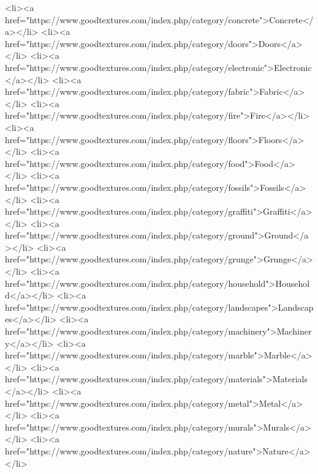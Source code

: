                                                     <li><a href="https://www.goodtextures.com/index.php/category/concrete">Concrete</a></li>
                                                    <li><a href="https://www.goodtextures.com/index.php/category/doors">Doors</a></li>
                                                    <li><a href="https://www.goodtextures.com/index.php/category/electronic">Electronic</a></li>
                                                    <li><a href="https://www.goodtextures.com/index.php/category/fabric">Fabric</a></li>
                                                    <li><a href="https://www.goodtextures.com/index.php/category/fire">Fire</a></li>
                                                    <li><a href="https://www.goodtextures.com/index.php/category/floors">Floors</a></li>
                                                    <li><a href="https://www.goodtextures.com/index.php/category/food">Food</a></li>
                                                    <li><a href="https://www.goodtextures.com/index.php/category/fossils">Fossils</a></li>
                                                    <li><a href="https://www.goodtextures.com/index.php/category/graffiti">Graffiti</a></li>
                                                    <li><a href="https://www.goodtextures.com/index.php/category/ground">Ground</a></li>
                                                    <li><a href="https://www.goodtextures.com/index.php/category/grunge">Grunge</a></li>
                                                    <li><a href="https://www.goodtextures.com/index.php/category/household">Household</a></li>
                                                    <li><a href="https://www.goodtextures.com/index.php/category/landscapes">Landscapes</a></li>
                                                    <li><a href="https://www.goodtextures.com/index.php/category/machinery">Machinery</a></li>
                                                    <li><a href="https://www.goodtextures.com/index.php/category/marble">Marble</a></li>
                                                    <li><a href="https://www.goodtextures.com/index.php/category/materials">Materials</a></li>
                                                    <li><a href="https://www.goodtextures.com/index.php/category/metal">Metal</a></li>
                                                    <li><a href="https://www.goodtextures.com/index.php/category/murals">Murals</a></li>
                                                    <li><a href="https://www.goodtextures.com/index.php/category/nature">Nature</a></li>
